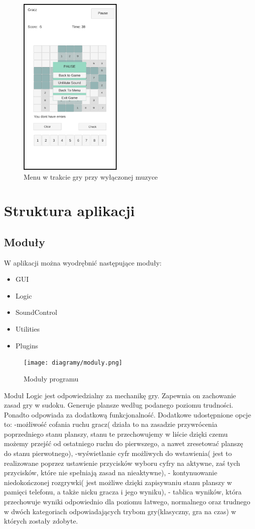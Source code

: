 \documentclass[a4paper, 11pt]{article}
\begin{document}
\begin{figure}[H]
	\centering
	\includegraphics[width=5cm]{zrzuty/11.png}
	\caption{Menu w trakcie gry przy wyłączonej muzyce}
	\label{fig:menu_pause2}
\end{figure}





\vfill
	\newpage
\section{Struktura aplikacji}
\subsection{Moduły}
W aplikacji można wyodrębnić następujące moduły:
\begin{itemize}
	\item GUI
	\item Logic
	\item SoundControl
	\item Utilities
	\item Plugins
\end{itemize}
\begin{figure}[H]
	\centering
	\texttt{[image: diagramy/moduly.png]}
	\caption{Moduły programu}
	\label{fig:modules}
\end{figure}

Moduł Logic jest odpowiedzialny za mechanikę gry. Zapewnia on zachowanie zasad gry w sudoku. Generuje plansze według podanego poziomu trudności. Ponadto odpowiada za dodatkową funkcjonalność. Dodatkowe udostępnione opcje to: 
-możliwość cofania ruchu gracz( działa to na zasadzie przywrócenia poprzedniego stanu planszy, stanu te przechowujemy w liście dzięki czemu możemy przejść od ostatniego ruchu do pierwszego, a nawet zresetować planszę do stanu pierwotnego), 
-wyświetlanie cyfr możliwych do wstawienia( jest to realizowane poprzez ustawienie przycisków wyboru cyfry na aktywne, zaś tych przycisków, które nie spełniają zasad na nieaktywne),
- kontynuowanie niedokończonej rozgrywki( jest możliwe dzięki zapisywaniu stanu planszy w pamięci telefonu, a także nicku gracza i jego wyniku),
- tablica wyników, która przechowuje wyniki odpowiednio dla poziomu łatwego, normalnego oraz trudnego w dwóch kategoriach odpowiadających trybom gry(klasyczny, gra na czas) w których zostały zdobyte. 
\end{document}
